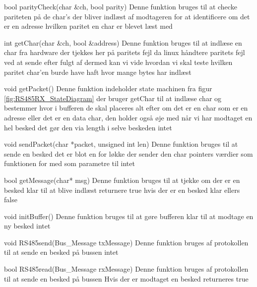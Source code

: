 \funk
{bool parityCheck(char \&ch, bool parity) }
{Denne funktion bruges til at checke pariteten på de char's der bliver indlæst af modtageren for at identificere om det er en adresse}
{hvilken paritet en char er blevet læst med}
{
}

\funk
{int getChar(char \&ch, bool \&address) }
{Denne funktion bruges til at indlæse en char fra hardware der tjekkes her på paritets fejl da linux håndtere paritets fejl ved at sende  efter fulgt af  dermed kan vi vide hvordan vi skal teste hvilken paritet char'en burde have haft}
{hvor mange bytes  har indlæst}
{
}

\funk
{void getPacket()}
{Denne funktion indeholder state machinen fra figur \ref{fig:RS485RX_StateDiagram} der bruger getChar til at indlæse char og bestemmer hvor i bufferen de skal placeres alt efter om det er en char som er en adresse eller det er en data char, den holder også øje med når vi har modtaget en hel besked det gør den via length i selve beskeden}
{intet}
{
}

\funk
{void sendPacket(char *packet, unsigned int len)}
{Denne funktion bruges til at sende en besked det er blot en for løkke der sender den char pointers værdier som funktionen for med som parametre til }
{intet}
{
}

\funk
{bool getMessage(char* msg)}
{Denne funktion bruges til at tjekke om der er en besked klar til at blive indlæst}
{returnere true hvis der er en besked klar ellers false}
{
}

\funk
{void initBuffer()}
{Denne funktion bruges til at gøre bufferen klar til at modtage en ny besked}
{intet}
{
}

\funk
{void RS485send(Bus\_Message\* txMessage)}
{Denne funktion bruges af protokollen til at sende en besked på bussen}
{intet}
{
}

\funk
{bool RS485read(Bus\_Message\* rxMessage)}
{Denne funktion bruges af protokollen til at sende en besked på bussen}
{Hvis der er modtaget en besked returneres true}
{
}


